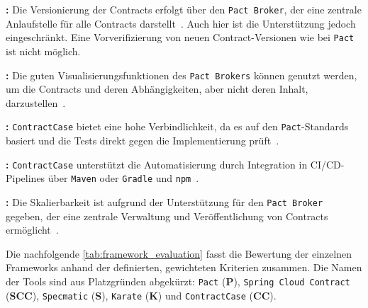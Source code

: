 \textbf{:} Die Versionierung der Contracts erfolgt über den \texttt{Pact Broker}, der eine zentrale Anlaufstelle für alle Contracts darstellt~\cite{CasecontracttestingContractcase2025}.
Auch hier ist die Unterstützung jedoch eingeschränkt.
Eine Vorverifizierung von neuen Contract-Versionen wie bei \texttt{Pact} ist \zB nicht möglich.

\textbf{:} Die guten Visualisierungsfunktionen des \texttt{Pact Brokers} können genutzt werden, um die Contracts und deren Abhängigkeiten, aber nicht deren Inhalt, darzustellen~\cite{CasecontracttestingContractcase2025}.

\textbf{:} \texttt{ContractCase} bietet eine hohe Verbindlichkeit, da es auf den \texttt{Pact}-Standards basiert und die Tests direkt gegen die Implementierung prüft~\cite{ContractCaseContractTesting}.

\textbf{:} \texttt{ContractCase} unterstützt die Automatisierung durch Integration in \gls{CI}/\gls{CD}-\glspl{Pipeline} über \texttt{\gls{Maven}} oder \texttt{\gls{Gradle}} und  \texttt{\gls{npm}}~\cite{ContractCaseContractTesting}.

\textbf{:} Die Skalierbarkeit ist aufgrund der Unterstützung für den \texttt{Pact Broker} gegeben, der eine zentrale Verwaltung und Veröffentlichung von Contracts ermöglicht~\cite{CasecontracttestingContractcase2025}.

\vspace{2em}
Die nachfolgende \cref{tab:framework_evaluation} fasst die Bewertung der einzelnen Frameworks anhand der definierten, gewichteten Kriterien zusammen.
Die Namen der Tools sind aus Platzgründen abgekürzt:
\texttt{Pact} (\textbf{P}), \texttt{Spring Cloud Contract} (\textbf{SCC}), \texttt{Specmatic} (\textbf{S}), \texttt{Karate} (\textbf{K}) und \texttt{ContractCase} (\textbf{CC}).

